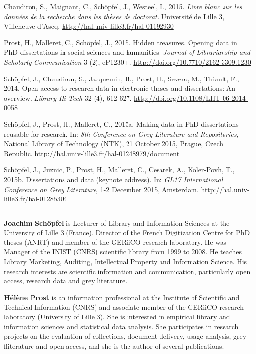 \documentclass[a4paper,
fontsize=11pt,
oneside,
numbers=noperiodatend,
parskip=half-,
bibliography=totoc,
final
]{scrartcl}
\begin{document}
Chaudiron, S., Maignant, C., Schöpfel, J., Westeel, I., 2015.
\emph{Livre blanc sur les données de la recherche dans les thèses de
doctorat.} Université de Lille 3, Villeneuve d'Ascq.
\url{http://hal.univ-lille3.fr/hal-01192930}

Prost, H., Malleret, C., Schöpfel, J., 2015. Hidden treasures. Opening
data in PhD dissertations in social sciences and humanities.
\emph{Journal of Librarianship and Scholarly Communication} 3 (2),
eP1230+. \url{http://doi.org/10.7710/2162-3309.1230}

Schöpfel, J., Chaudiron, S., Jacquemin, B., Prost, H., Severo, M.,
Thiault, F., 2014. Open access to research data in electronic theses and
dissertations: An overview. \emph{Library Hi Tech} 32 (4), 612-627.
\url{http://doi.org/10.1108/LHT-06-2014-0058}

Schöpfel, J., Prost, H., Malleret, C., 2015a. Making data in PhD
dissertations reusable for research. In: \emph{8th Conference on Grey
Literature and Repositories}, National Library of Technology (NTK), 21
October 2015, Prague, Czech Republic.
\url{http://hal.univ-lille3.fr/hal-01248979/document}

Schöpfel, J., Juznic, P., Prost, H., Malleret, C., Cesarek, A.,
Koler-Povh, T., 2015b. Dissertations and data (keynote address). In:
\emph{GL17 International Conference on Grey Literature}, 1-2 December
2015, Amsterdam. \url{http://hal.univ-lille3.fr/hal-01285304}

\begin{center}\rule{0.5\linewidth}{\linethickness}\end{center}

\textbf{Joachim Schöpfel} is Lecturer of Library and Information
Sciences at the University of Lille 3 (France), Director of the French
Digitization Centre for PhD theses (ANRT) and member of the GERiiCO
research laboratory. He was Manager of the INIST (CNRS) scientific
library from 1999 to 2008. He teaches Library Marketing, Auditing,
Intellectual Property and Information Science. His research interests
are scientific information and communication, particularly open access,
research data and grey literature.

\textbf{Hélène Prost} is an information professional at the Institute of
Scientific and Technical Information (CNRS) and associate member of the
GERiiCO research laboratory (University of Lille 3). She is interested
in empirical library and information sciences and statistical data
analysis. She participates in research projects on the evaluation of
collections, document delivery, usage analysis, grey fliterature and
open access, and she is the author of several publications.
\end{document}
